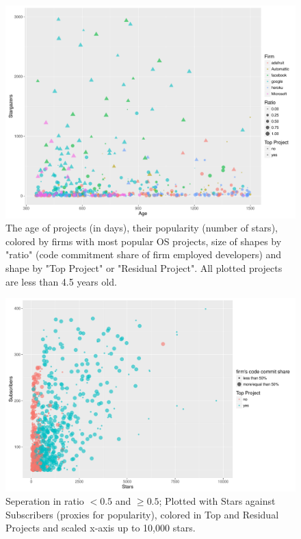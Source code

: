 \begin{landscape}
\begin{figure}
	\centering
	\includegraphics[page=1,scale=0.4]{../graphics/intro/code_contribution_age_firms_ratio.pdf}
	\caption{The age of projects (in days), their popularity (number of stars), colored by firms with most popular OS projects, size of shapes by "ratio" (code commitment share of firm employed developers) and shape by "Top Project" or "Residual Project". All plotted projects are less than 4.5 years old.}
	\label{fig:code_contribution_age_firms_ratio}
\end{figure}

\begin{figure}
	\centering
	\includegraphics[page=1,scale=0.4]{../graphics/intro/stars_subscribers_ratio_top_10000.pdf}
	\caption{Seperation in ratio $< 0.5$ and $\geq 0.5$; Plotted with Stars against Subscribers (proxies for popularity), colored in Top and Residual Projects and scaled x-axis up to 10,000 stars.}
	\label{fig:stars_subscribers_ratio_top_10000}
\end{figure}


\end{landscape}
